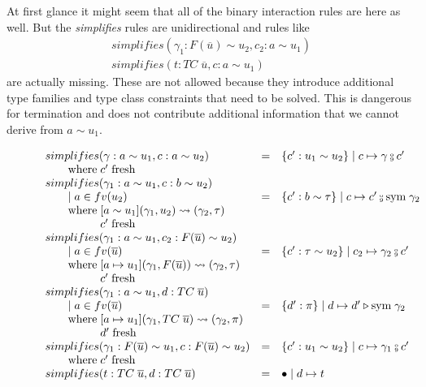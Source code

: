 At first glance it might seem that all of the binary interaction rules are here
as well. But the \textit{simplifies} rules are unidirectional and rules like
\[
\begin{array}{l}
simplifies(\gamma_1 : F(\overline{u}) \sim u_2, c_2 : a \sim u_1)
\\
simplifies(t : TC \; \overline{u}, c : a \sim u_1)
\end{array}
\]
are actually missing. These are not allowed because they introduce additional
type families and type class constraints that need to be solved. This is
dangerous for termination and does not contribute additional information that we
cannot derive from $a \sim u_1$.

\begin{figure}
\small
{}
\[
\begin{array}{l c l}
simplifies(\gamma : a \sim u_1, c : a \sim u_2) &=& \{c' : u_1 \sim u_2\} \mid c
\mapsto \gamma \fctrans c'
\\ \where c' \; \text{fresh}
\\
simplifies(\gamma_1 : a \sim u_1, c : b \sim u_2)
\\ \guard a \in fv(u_2) &=& \{c' : b \sim \tau\} \mid c \mapsto c' \fctrans
\text{sym} \; \gamma_2
\\ \where [a \sim u_1](\gamma_1, u_2) \rightsquigarrow (\gamma_2, \tau)
\\ \whereindent c' \; \text{fresh}
\\
simplifies(\gamma_1 : a \sim u_1, c_2 : F(\overline{u}) \sim u_2)
\\ \guard a \in fv(\overline{u}) &=& \{c': \tau \sim u_2\} \mid c_2 \mapsto
\gamma_2 \fctrans c'
\\ \where [a \mapsto u_1](\gamma_1, F(\overline{u})) \rightsquigarrow (\gamma_2,
\tau)
\\ \whereindent c' \; \text{fresh}
\\
simplifies(\gamma_1 : a \sim u_1, d : TC \; \overline{u})
\\ \guard a \in fv(\overline{u}) &=& \{d' : \pi\} \mid d \mapsto
d' \triangleright \text{sym} \; \gamma_2
\\ \where [a \mapsto u_1](\gamma_1, TC \; \overline{u}) \rightsquigarrow
(\gamma_2, \pi)
\\ \whereindent d' \; \text{fresh}
\\
simplifies(\gamma_1 : F(\overline{u}) \sim u_1, c : F(\overline{u}) \sim u_2)
&=& \{c' : u_1 \sim u_2\} \mid c \mapsto \gamma_1 \fctrans c'
\\ \where c' \; \text{fresh}
\\
simplifies(t : TC \; \overline{u}, d : TC \; \overline{u}) &=& \bullet \mid d
\mapsto t
\end{array}
\]
\end{figure}

